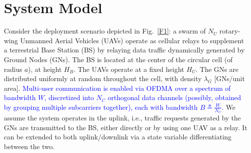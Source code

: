 \documentclass[12pt, draftcls, onecolumn]{IEEEtran}
\theoremstyle{plain}
\theoremstyle{definition}
\theoremstyle{remark}
\newcommand\hlt[1]{\textcolor{blue}{#1}}
\begin{document}
\section{System Model}\label{S2}
Consider the deployment scenario depicted in Fig.~\ref{F1}: a swarm of $N_{U}$ rotary-wing Unmanned Aerial Vehicles (UAVs) operate as cellular relays to supplement a terrestrial Base Station (BS) by relaying data traffic dynamically generated by Ground Nodes (GNs). The BS is located at the center of the circular cell (of radius $a$), at height $H_{B}$. The UAVs operate at a fixed height $H_{U}$. The GNs are distributed uniformly at random throughout the cell, with density $\lambda_{G}$ [GNs/unit area]. \hlt{Multi-user communication is enabled via OFDMA over a spectrum of bandwidth $W$, discretized into $N_{C}$ orthogonal data channels (possibly, obtained by grouping multiple subcarriers together), each with bandwidth $B{\triangleq}\frac{W}{N_{C}}$.} We assume the system operates in the uplink, i.e., traffic requests generated by the GNs are transmitted to the BS, either directly or by using one UAV as a relay. It can be extended to both uplink/downlink via a state variable differentiating between the two.
\end{document}
